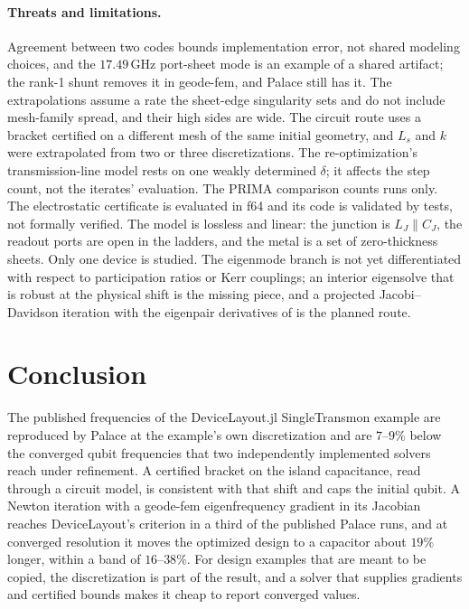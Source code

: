 \documentclass{anvil-paper}
\begin{document}
\paragraph{Threats and limitations.}
Agreement between two codes bounds implementation error, not shared
modeling choices, and the $17.49$\,GHz port-sheet mode is an example of
a shared artifact; the rank-1 shunt removes it in geode-fem, and Palace
still has it. The extrapolations assume a rate the sheet-edge singularity
sets and do not include mesh-family spread, and their high sides are
wide. The circuit route uses a bracket certified on a different mesh of
the same initial geometry, and $L_s$ and $k$ were extrapolated from two or
three discretizations. The re-optimization's transmission-line model
rests on one weakly determined $\delta$; it affects the step count, not
the iterates' evaluation. The PRIMA comparison counts runs only. The
electrostatic certificate is evaluated in f64 and its code is validated
by tests, not formally verified. The model is lossless and linear: the
junction is $L_J \parallel C_J$, the readout ports are open in the ladders,
and the metal is a set of zero-thickness sheets. Only one device is
studied. The eigenmode branch is not yet differentiated with respect to
participation ratios or Kerr couplings; an interior eigensolve that is
robust at the physical shift is the missing piece, and a projected
Jacobi--Davidson iteration \citep{liang2026adaptive} with the eigenpair
derivatives of \citet{nelson1976simplified} is the planned route.

\section{Conclusion}
\label{sec:conclusion}

The published frequencies of the DeviceLayout.jl SingleTransmon example
are reproduced by Palace at the example's own discretization and are
$7$--$9\%$ below the converged qubit frequencies that two independently
implemented solvers reach under refinement. A certified bracket on the
island capacitance, read through a circuit model, is consistent with that
shift and caps the initial qubit. A Newton iteration with a geode-fem eigenfrequency
gradient in its Jacobian reaches DeviceLayout's criterion in a third of
the published Palace runs, and at converged resolution it moves the
optimized design to a capacitor about $19\%$ longer, within a band of
$16$--$38\%$. For design examples that are meant to be copied, the
discretization is part of the result, and a solver that supplies
gradients and certified bounds makes it cheap to report converged values.
\end{document}

